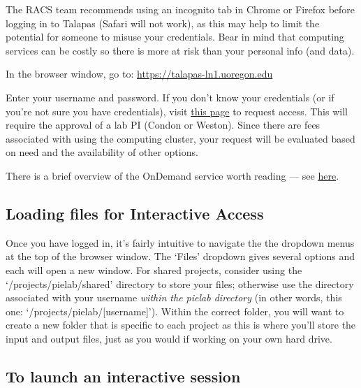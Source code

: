\documentclass[]{book}
\begin{document}
The RACS team recommends using an incognito tab in Chrome or Firefox before logging in to Talapas (Safari will not work), as this may help to limit the potential for someone to misuse your credentials. Bear in mind that computing services can be costly so there is more at risk than your personal info (and data).

In the browser window, go to:
\url{https://talapas-ln1.uoregon.edu}

Enter your username and password. If you don't know your credentials (or if you're not sure you have credentials), visit \href{https://hpcf.uoregon.edu/content/request-access}{this page} to request access. This will require the approval of a lab PI (Condon or Weston). Since there are fees associated with using the computing cluster, your request will be evaluated based on need and the availability of other options.

There is a brief overview of the OnDemand service worth reading --- see \href{https://hpcrcf.atlassian.net/wiki/spaces/TCP/pages/922746881/Open+OnDemand}{here}.

\hypertarget{loading-files-for-interactive-access}{%
\subsection{Loading files for Interactive Access}\label{loading-files-for-interactive-access}}

Once you have logged in, it's fairly intuitive to navigate the the dropdown menus at the top of the browser window. The `Files' dropdown gives several options and each will open a new window. For shared projects, consider using the `/projects/pielab/shared' directory to store your files; otherwise use the directory associated with your username \emph{within the pielab directory} (in other words, this one: `/projects/pielab/{[}username{]}'). Within the correct folder, you will want to create a new folder that is specific to each project as this is where you'll store the input and output files, just as you would if working on your own hard drive.

\hypertarget{to-launch-an-interactive-session}{%
\subsection{To launch an interactive session}\label{to-launch-an-interactive-session}}
\end{document}
